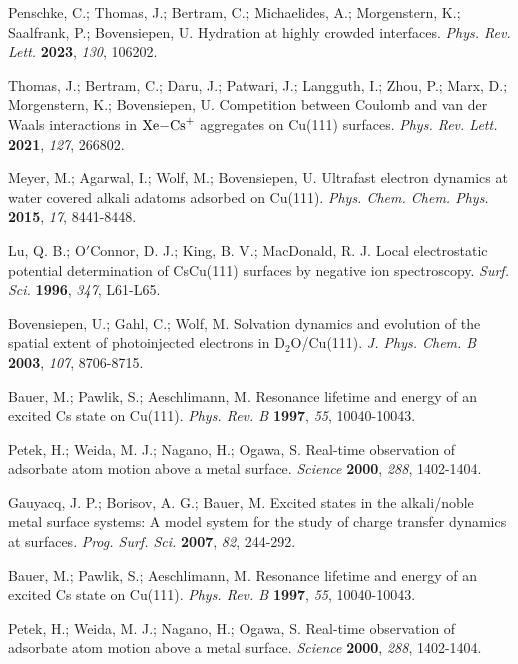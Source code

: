 \documentclass[aps,twocolumn,amssymb,amsfonts,amsmath,showpacs,final,a4paper,superscriptaddress]{revtex4-2}
\begin{document}
\begin{thebibliography}{99}
 Penschke, C.; Thomas, J.; Bertram, C.; Michaelides, A.; Morgenstern, K.; Saalfrank, P.; Bovensiepen, U. Hydration at highly crowded interfaces. \textit{Phys. Rev. Lett.} \textbf{2023}, \textit{130}, 106202.

 Thomas, J.; Bertram, C.; Daru, J.; Patwari, J.; Langguth, I.; Zhou, P.; Marx, D.; Morgenstern, K.; Bovensiepen, U. Competition between Coulomb and van der Waals interactions in $\mathrm{Xe}\text{\ensuremath{-}}{\mathrm{Cs}}^{+}$  aggregates on Cu(111) surfaces. \textit{Phys. Rev. Lett.} \textbf{2021}, \textit{127}, 266802.


 Meyer, M.; Agarwal, I.; Wolf, M.; Bovensiepen, U. Ultrafast electron dynamics at water covered alkali adatoms adsorbed on Cu(111). \textit{Phys. Chem. Chem. Phys.} \textbf{2015}, \textit{17}, 8441-8448.

 Lu, Q. B.; O$'$Connor, D. J.; King, B. V.; MacDonald, R. J. Local electrostatic potential determination of CsCu(111) surfaces by negative ion spectroscopy. \textit{Surf. Sci.} \textbf{1996}, \textit{347}, L61-L65.

 Bovensiepen, U.; Gahl, C.; Wolf, M. Solvation dynamics and evolution of the spatial extent of photoinjected electrons in D$_2$O/Cu(111). \textit{J. Phys. Chem. B} \textbf{2003}, \textit{107}, 8706-8715.

 Bauer, M.; Pawlik, S.; Aeschlimann, M. Resonance lifetime and energy of an excited Cs state on Cu(111). \textit{Phys. Rev. B} \textbf{1997}, \textit{55}, 10040-10043.

 Petek, H.; Weida, M. J.; Nagano, H.; Ogawa, S. Real-time observation of adsorbate atom motion above a metal surface. \textit{Science} \textbf{2000}, \textit{288}, 1402-1404.

 Gauyacq, J. P.; Borisov, A. G.; Bauer, M. Excited states in the alkali/noble metal surface systems: A model system for the study of charge transfer dynamics at surfaces. \textit{Prog. Surf. Sci.} \textbf{2007}, \textit{82}, 244-292.

 Bauer, M.; Pawlik, S.; Aeschlimann, M. Resonance lifetime and energy of an excited Cs state on Cu(111). \textit{Phys. Rev. B} \textbf{1997}, \textit{55}, 10040-10043.

 Petek, H.; Weida, M. J.; Nagano, H.; Ogawa, S. Real-time observation of adsorbate atom motion above a metal surface. \textit{Science} \textbf{2000}, \textit{288}, 1402-1404.


\end{thebibliography}
\end{document}
